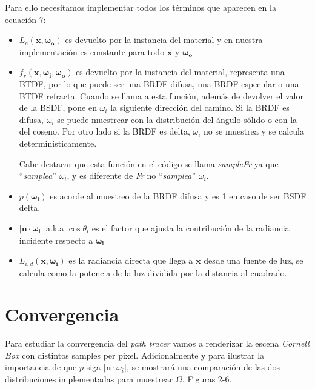 \documentclass{article}
\begin{document}
Para ello necesitamos implementar todos los términos que aparecen en la ecuación
7:

\begin{itemize}
  \item \(L_e(\mathbf{x}, \mathbf{\omega_{o}})\) es devuelto por la instancia
        del material y en nuestra implementación es constante para todo
        \(\mathbf{x}\) y \(\mathbf{\omega_{o}}\)
  \item \(f_r(\mathbf{x}, \mathbf{\omega_{i}}, \mathbf{\omega_{o}}) \) es
        devuelto por la instancia del material, representa una BTDF, por lo que
        puede ser una BRDF difusa, una BRDF especular o una BTDF refracta. Cuando
        se llama a esta función, además de devolver el valor de la BSDF, pone en
        \(\omega_{i}\) la siguiente dirección del camino. Si la BRDF es difusa,
        \(\omega_{i}\) se puede muestrear con la distribución del ángulo sólido
        o con la del coseno. Por otro lado si la BRDF es delta, \(\omega_{i}\)
        no se muestrea y se calcula deterministicamente.

        Cabe destacar que esta función en el código se llama \textit{sampleFr}
        ya que ``\textit{samplea}'' \(\omega_{i}\), y es diferente de \textit{Fr}
        no ``\textit{samplea}'' \(\omega_{i}\).
  \item \(p(\mathbf{\omega_{i}})\) es acorde al muestreo de la BRDF difusa y        es 1 en caso de ser BSDF delta.
  \item \(|\mathbf{n} \cdot \mathbf{\omega_{i}}|\) a.k.a \(\cos\theta_{i}\) es
        el factor que ajusta la contribución de la radiancia incidente respecto
        a \(\mathbf{\omega_{i}}\)
  \item \(L_{i,d}(\mathbf{x}, \mathbf{\omega_{i}})\) es la radiancia directa que
        llega a \(\mathbf{x}\) desde una fuente de luz, se calcula como la
        potencia de la luz dividida por la distancia al cuadrado.
\end{itemize}

\section{Convergencia}

Para estudiar la convergencia del \textit{path tracer} vamos a renderizar la
escena \textit{Cornell Box} con distintos samples per pixel. Adicionalmente y
para ilustrar la importancia de que \(p\) siga \(|\mathbf{n}\cdot \omega_{i}|\),
se mostrará una comparación de las dos distribuciones implementadas para
muestrear \(\Omega\). Figuras 2-6.
\end{document}
